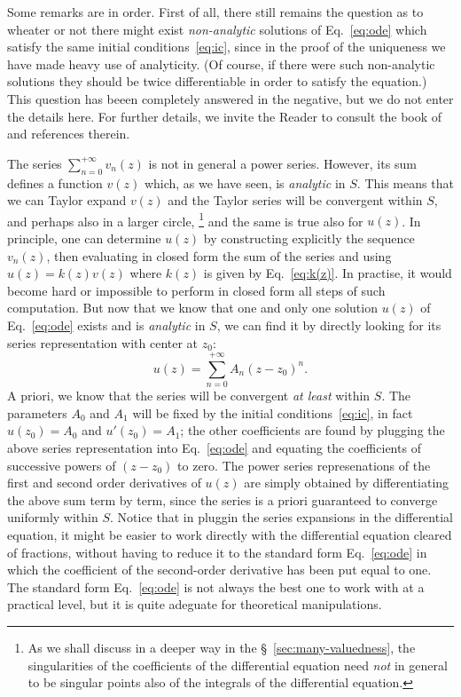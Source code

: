 Some remarks are in order.  First of all,
there still remains the question as to wheater or not there might exist
\emph{non-analytic} solutions of Eq.~\eqref{eq:ode} which satisfy the same
initial conditions~\eqref{eq:ic}, since in the proof of the uniqueness we have
made heavy use of analyticity.  (Of course, if there were such non-analytic
solutions they should be twice differentiable in order to satisfy the
equation.) This question has beeen completely answered in the negative, but we
do not enter the details here.  For further  details, we invite the Reader to
consult the book of \textcite{Ince:1956} and references therein.

The series $\sum_{n=0}^{+\infty} v_{n}(z)$ is not in  general a power series.  However, its sum defines a function
$v(z)$ which, as we have seen, is \emph{analytic} in $S$. This means that we can
Taylor expand $v(z)$ and the Taylor series will be convergent within $S$, and
perhaps also in a larger circle,%
\footnote{As we shall discuss in a deeper way in the \S~\ref{sec:many-valuedness}, the
   singularities of the coefficients of the differential equation need \emph{not}
   in general to
   be singular points also of the integrals of the differential equation.}
and
the same is true also for $u(z)$.
In principle, one
can determine $u(z)$ by constructing explicitly the sequence $v_{n}(z)$,
then evaluating in closed form the sum of the series and using $u(z) =k(z) v(z)$ where $k(z)$ is
given by Eq.~\eqref{eq:k(z)}. In practise, it would
become hard or impossible to perform in closed form all steps of such computation.  But now that we know
that one and only one solution $u(z)$ of Eq.~\eqref{eq:ode} exists and is
\emph{analytic}  in $S$, we can find it by directly 
looking for its  series representation with center  at $z_{0}$:
\begin{dmath*}
   u(z) =  \sum_{n=0}^{+\infty} A_{n} (z-z_{0})^{n} .
\end{dmath*}
A priori, we know that  the series will be convergent \emph{at least} within
$S$.  The parameters $A_{0}$ and $A_{1}$ will be  fixed by the initial
conditions~\eqref{eq:ic}, in fact $u(z_{0}) = A_{0}$ and $u'(z_{0}) = A_{1}$;
the other coefficients are found by plugging the above series representation
into Eq.~\eqref{eq:ode} and equating the coefficients of successive powers of
$(z-z_{0})$ to zero.  The power series represenations of the first  and second
order derivatives of $u(z)$ are simply obtained by differentiating the above sum
term by term, since the series is a priori guaranteed to converge uniformly
within $S$.  Notice that in pluggin the series expansions  in the differential equation, it might be easier to work
directly with the differential equation cleared of fractions, without having to
reduce it to the standard form Eq.~\eqref{eq:ode} in which the coefficient of
the second-order derivative has been put equal to one. The standard form
Eq.~\eqref{eq:ode} is not always the best one to work with at a practical level,
but it is quite adeguate for theoretical manipulations.

